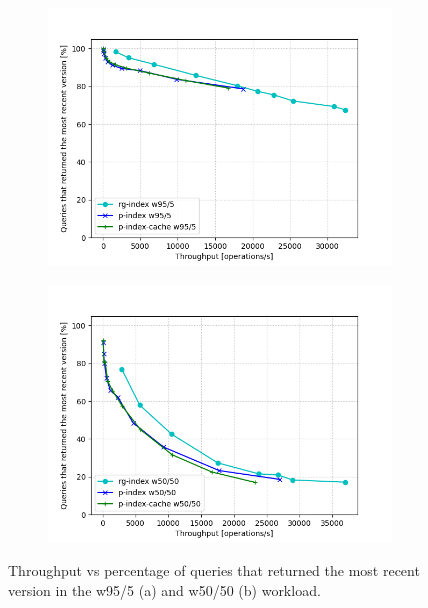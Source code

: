 \begin{figure}[H]
  \begin{subfigure}{0.5\textwidth}
    \includegraphics[width=\linewidth]{./figures/evaluation/freshness_throughput_9505.png}
    \caption{}
    \label{fig:freshness_throughput_9505}
  \end{subfigure}%
  \hspace*{\fill}
  \begin{subfigure}{0.5\textwidth}
    \includegraphics[width=\linewidth]{./figures/evaluation/freshness_throughput_5050.png}
    \caption{}
    \label{fig:freshness_throughput_5050}
  \end{subfigure}%
  \caption{Throughput vs percentage of queries that returned the most recent version in the w95/5 (a) and w50/50 (b) workload.}
  \label{fig:ycsb_readV_freshness_throughput}
\end{figure}

